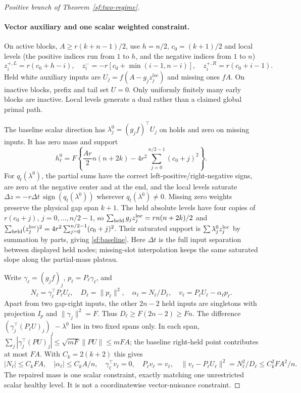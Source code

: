 \begin{proof}[Positive branch of Theorem~\ref{sf:two-regime}]
\paragraph{Vector auxiliary and one scalar weighted constraint.}
On active blocks, $A\ge r(k+n-1)/2$, use $h=n/2$, $c_0=(k+1)/2$ and local levels (the positive indices run from $1$ to $h$,
and the negative indices from $1$ to $n$)
\[
z_i^{+,L}=r(c_0+h-i),\quad
z_i^-=-r[c_0+\min(i-1,n-i)],\quad
z_i^{+,R}=r(c_0+i-1).
\]
Held white auxiliary inputs are $U_j=f(A-g_jz_j^{loc})$ and missing ones $fA$.
On inactive blocks, prefix and tail set $U=0$.
Only uniformly finitely many early blocks are inactive.
Local levels generate a dual rather than a claimed global primal path.

The baseline scalar direction has $\lambda_j^0=(g_jf)^\top U_j$ on holds
and zero on missing inputs. It has zero mass and support
\begin{equation}\label{sf:baseline}
h_\ell^0=F\left\{\frac{Ar}{2}n(n+2k)
-4r^2\sum_{j=0}^{n/2-1}(c_0+j)^2\right\}.
\end{equation}
For $q_t(\lambda^0)$, the partial sums have the correct left-positive/right-negative signs,
are zero at the negative center and at the end, and the local levels
saturate $\Delta z=-r\Delta t\,\operatorname{sign}(q_t(\lambda^0))$ wherever $q_t(\lambda^0)\ne0$.
Missing zero weights preserve the physical gap span $k+1$.
The held absolute levels have four copies of
$r(c_0+j)$, $j=0,\ldots,n/2-1$, so
$\sum_{\rm held}g_jz_j^{\rm loc}=rn(n+2k)/2$ and
$\sum_{\rm held}(z_j^{\rm loc})^2=4r^2\sum_{j=0}^{n/2-1}(c_0+j)^2$.
Their saturated support is $\sum\lambda_j^0z_j^{\rm loc}$ by summation
by parts, giving \eqref{sf:baseline}. Here $\Delta t$ is the full input
separation between displayed held nodes; missing-slot interpolation keeps
the same saturated slope along the partial-mass plateau.

Write $\gamma_\ell=(g_jf)_j$, $p_\ell=P_\ell \gamma_\ell$, and
\[
N_\ell=\gamma_\ell^\top P_\ell U_\ell,\quad
D_\ell=\|p_\ell\|^2,\quad \alpha_\ell=N_\ell/D_\ell,\quad
v_\ell=P_\ell U_\ell-\alpha_\ell p_\ell .
\]
Apart from two gap-right inputs, the other $2n-2$ held inputs are singletons
with projection $I_p$ and $\|\gamma_j\|^2=F$.
Thus $D_\ell\ge F(2n-2)\ge Fn$.
The difference $(\gamma_j^\top(P_\ell U)_j)_j-\lambda^0$ lies in two fixed
spans only. In each span,
$\sum_j|\gamma_j^\top(PU)_j|\le\sqrt{mF}\|PU\|\le mFA$;
the baseline right-held point contributes at most $FA$.
With $C_k=2(k+2)$ this gives
\[
|N_\ell|\le C_kFA,\quad |\alpha_\ell|\le C_kA/n,\quad
\gamma_\ell^\top v_\ell=0,\quad P_\ell v_\ell=v_\ell,\quad
\|v_\ell-P_\ell U_\ell\|^2=N_\ell^2/D_\ell\le C_k^2FA^2/n .
\]
The repaired mass is one scalar constraint, exactly matching one unrestricted
scalar healthy level. It is not a coordinatewise vector-nuisance constraint.


\end{proof}
